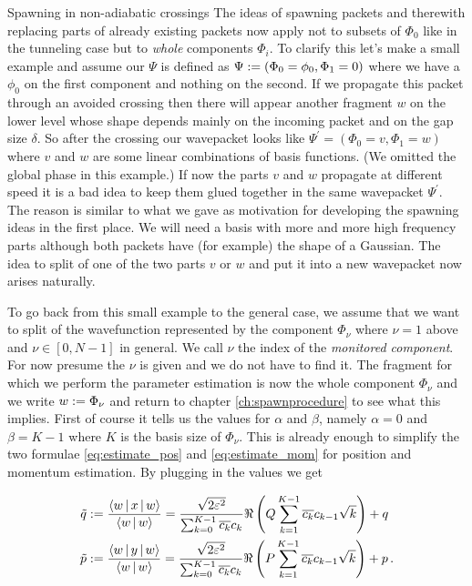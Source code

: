 \begin{chapter}{Spawning in non-adiabatic crossings}
The ideas of spawning packets and therewith replacing parts of already existing
packets now apply not to subsets of $\Phi_0$ like in the tunneling case but
to \emph{whole} components $\Phi_i$. To clarify this let's make a small example
and assume our $\Psi$ is defined as $\Psi := \left(\Phi_0=\phi_0, \Phi_1=0\right)$
where we have a $\phi_0$ on the first component and nothing on the second. If
we propagate this packet through an avoided crossing then there will appear
another fragment $w$ on the lower level whose shape depends mainly on the incoming packet
and on the gap size $\delta$. So after the crossing our wavepacket looks like
$\Psi^\prime = \left(\Phi_0=v, \Phi_1=w\right)$ where $v$ and $w$ are some
linear combinations of basis functions. (We omitted the global phase in this
example.) If now the parts $v$ and $w$ propagate at different speed it is
a bad idea to keep them glued together in the same wavepacket $\Psi^\prime$.
The reason is similar to what we gave as motivation for developing the spawning
ideas in the first place. We will need a basis with more and more high frequency
parts although both packets have (for example) the shape of a Gaussian. The idea
to split of one of the two parts $v$ or $w$ and put it into a new wavepacket now
arises naturally.

To go back from this small example to the general case, we assume that we want
to split of the wavefunction represented by the component $\Phi_\nu$ where
$\nu=1$ above and $\nu \in [0, N-1]$ in general. We call $\nu$ the index of
the \emph{monitored component}. For now presume the $\nu$
is given and we do not have to find it. The fragment for which we perform
the parameter estimation is now the whole component $\Phi_\nu$ and we
write $w := \Phi_\nu$ and return to chapter \ref{ch:spawnprocedure} to
see what this implies. First of course it tells us the values for $\alpha$
and $\beta$, namely $\alpha=0$ and $\beta=K-1$ where $K$ is the basis size
of $\Phi_\nu$. This is already enough to simplify the two formulae 
\eqref{eq:estimate_pos} and \eqref{eq:estimate_mom} for position and momentum
estimation. By plugging in the values we get

\begin{align}
  \tilde{q} & := \frac{\Braket{w | x | w}}{\Braket{w|w}}
            = \frac{\sqrt{2 \varepsilon^2}}{\sum_{k=0}^{K-1} \overline{c_k} c_k} \Re \left(Q \sum_{k=1}^{K-1} \overline{c_k} c_{k-1} \sqrt{k} \right) + q 
            \label{eq:estimate_pos_na} \\
  \tilde{p} & := \frac{\Braket{w | y | w}}{\Braket{w|w}}
            = \frac{\sqrt{2 \varepsilon^2}}{\sum_{k=0}^{K-1} \overline{c_k} c_k} \Re \left(P \sum_{k=1}^{K-1} \overline{c_k} c_{k-1} \sqrt{k} \right) + p \,.
            \label{eq:estimate_mom_na}
\end{align}


\end{chapter}
